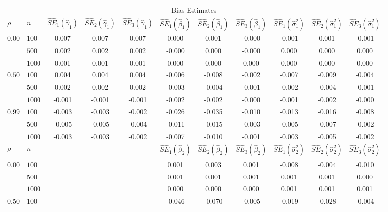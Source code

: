 \documentclass[10pt]{article}
\begin{document}
\begin{table}[ht]
\begin{center}
\begin{tabular}{llccccccccc}
   \hline \multicolumn{11}{c}{Bias Estimates}\\ $\rho$ & $n$ & $\widehat{SE}_1(\widehat{\gamma}_1)$ & $\widehat{SE}_2(\widehat{\gamma}_1)$ & $\widehat{SE}_3(\widehat{\gamma}_1)$ & $\widehat{SE}_1(\widehat{\beta}_1)$ & $\widehat{SE}_2(\widehat{\beta}_1)$ & $\widehat{SE}_3(\widehat{\beta}_1)$ & $\widehat{SE}_1(\widehat{\sigma}^2_1)$ & $\widehat{SE}_2(\widehat{\sigma}^2_1)$ & $\widehat{SE}_3(\widehat{\sigma}^2_1)$ \\ 
   \hline$0.00$ & $100$ & 0.007 & 0.007 & 0.007 & 0.000 & 0.001 & -0.000 & -0.001 & 0.001 & -0.001 \\ 
    & $500$ & 0.002 & 0.002 & 0.002 & -0.000 & 0.000 & -0.000 & 0.000 & 0.000 & 0.000 \\ 
    & $1000$ & 0.001 & 0.001 & 0.001 & 0.000 & 0.000 & 0.000 & 0.000 & 0.000 & 0.000 \\ 
  $0.50$ & $100$ & 0.004 & 0.004 & 0.004 & -0.006 & -0.008 & -0.002 & -0.007 & -0.009 & -0.004 \\ 
    & $500$ & 0.002 & 0.002 & 0.002 & -0.003 & -0.004 & -0.001 & -0.002 & -0.004 & -0.001 \\ 
    & $1000$ & -0.001 & -0.001 & -0.001 & -0.002 & -0.002 & -0.000 & -0.001 & -0.002 & -0.000 \\ 
  $0.99$ & $100$ & -0.003 & -0.003 & -0.002 & -0.026 & -0.035 & -0.010 & -0.013 & -0.016 & -0.008 \\ 
    & $500$ & -0.005 & -0.005 & -0.004 & -0.011 & -0.015 & -0.003 & -0.005 & -0.007 & -0.002 \\ 
    & $1000$ & -0.003 & -0.003 & -0.002 & -0.007 & -0.010 & -0.001 & -0.003 & -0.005 & -0.002 \\ 
   \hline$\rho$ & $n$ &   &   &   & $\widehat{SE}_1(\widehat{\beta}_2)$ & $\widehat{SE}_2(\widehat{\beta}_2)$ & $\widehat{SE}_3(\widehat{\beta}_2)$ & $\widehat{SE}_1(\widehat{\sigma}^2_2)$ & $\widehat{SE}_2(\widehat{\sigma}^2_2)$ & $\widehat{SE}_3(\widehat{\sigma}^2_2)$ \\ 
   \hline$0.00$ & $100$ &   &   &   & 0.001 & 0.003 & 0.001 & -0.008 & -0.004 & -0.010 \\ 
    & $500$ &   &   &   & 0.001 & 0.001 & 0.001 & 0.001 & 0.001 & 0.000 \\ 
    & $1000$ &   &   &   & 0.000 & 0.000 & 0.000 & 0.001 & 0.001 & 0.001 \\ 
  $0.50$ & $100$ &   &   &   & -0.046 & -0.070 & -0.005 & -0.019 & -0.028 & -0.004 \\ 

\end{tabular}
\end{center}
\end{table}
\end{document}
